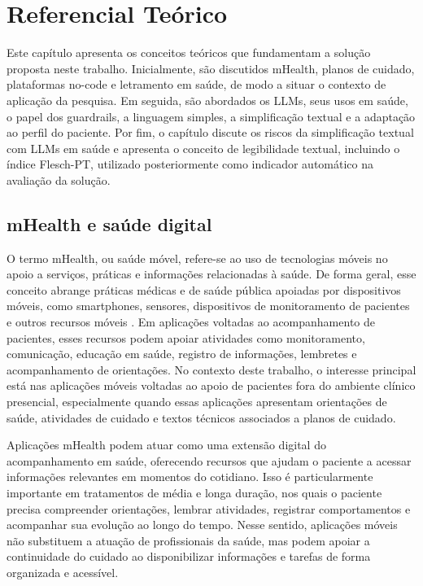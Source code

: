 \chapter{Referencial Teórico}
\label{cap:referencial}

Este capítulo apresenta os conceitos teóricos que fundamentam a solução proposta neste trabalho. Inicialmente, são discutidos mHealth, planos de cuidado, plataformas no-code e letramento em saúde, de modo a situar o contexto de aplicação da pesquisa. Em seguida, são abordados os LLMs, seus usos em saúde, o papel dos guardrails, a linguagem simples, a simplificação textual e a adaptação ao perfil do paciente. Por fim, o capítulo discute os riscos da simplificação textual com LLMs em saúde e apresenta o conceito de legibilidade textual, incluindo o índice Flesch-PT, utilizado posteriormente como indicador automático na avaliação da solução.

\section{mHealth e saúde digital}
\label{sec:mhealth-aplicacoes-moveis-saude}

O termo mHealth, ou saúde móvel, refere-se ao uso de tecnologias móveis no apoio a serviços, práticas e informações relacionadas à saúde. De forma geral, esse conceito abrange práticas médicas e de saúde pública apoiadas por dispositivos móveis, como smartphones, sensores, dispositivos de monitoramento de pacientes e outros recursos móveis \cite{who2011mhealth}. Em aplicações voltadas ao acompanhamento de pacientes, esses recursos podem apoiar atividades como monitoramento, comunicação, educação em saúde, registro de informações, lembretes e acompanhamento de orientações. No contexto deste trabalho, o interesse principal está nas aplicações móveis voltadas ao apoio de pacientes fora do ambiente clínico presencial, especialmente quando essas aplicações apresentam orientações de saúde, atividades de cuidado e textos técnicos associados a planos de cuidado.

Aplicações mHealth podem atuar como uma extensão digital do acompanhamento em saúde, oferecendo recursos que ajudam o paciente a acessar informações relevantes em momentos do cotidiano. Isso é particularmente importante em tratamentos de média e longa duração, nos quais o paciente precisa compreender orientações, lembrar atividades, registrar comportamentos e acompanhar sua evolução ao longo do tempo. Nesse sentido, aplicações móveis não substituem a atuação de profissionais da saúde, mas podem apoiar a continuidade do cuidado ao disponibilizar informações e tarefas de forma organizada e acessível.

